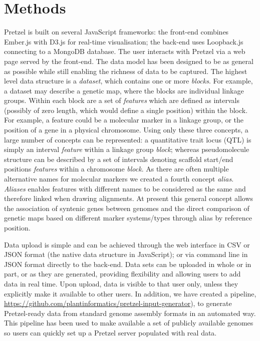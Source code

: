 %
\section{Methods}

Pretzel is built on several JavaScript frameworks: the front-end combines Ember.js with D3.js
  for real-time visualisation; the back-end uses Loopback.js connecting to a MongoDB database. 
%
The user interacts with Pretzel via a web page served by the front-end. 
%
The data model has been designed to be as general as possible while still enabling the richness of
  data to be captured. 
%
  The highest level data structure is a \textit{dataset}, which contains one or more \textit{blocks}.
%
For example, a dataset may describe a genetic map, where the blocks are individual linkage groups. 
%
  Within each block are a set of \textit{features} which are defined as intervals (possibly of zero length,
  which would define a single position) within the block. 
%
For example, a feature could be a molecular marker in a linkage group, or the position of a gene in
  a physical chromosome. 
%
Using only these three concepts, a large number of concepts can be represented: a quantitative trait locus
  (QTL) is simply an interval \textit{feature} within a linkage group \textit{block}; whereas pseudomolecule structure can be described by a
  set of intervals denoting scaffold start/end positions \textit{features} within a chromosome \textit{block}. 
%
As there are often multiple alternative names for molecular markers we created a fourth concept \textit{alias}. 
\textit{Aliases} enables features with different names to be considered as the same and therefore linked when drawing alignments. 
%
At present this general concept allows the association of syntenic genes between genomes and the direct comparison of genetic maps
  based on different marker systems/types through alias by reference position.

Data upload is simple and can be achieved through the web interface in CSV or JSON format (the native data structure in
  JavaScript); or via command line in JSON format directly to the back-end. 
%
Data sets can be uploaded in whole or in part, or as they are generated, providing flexibility and allowing users to add data in real time.
%
Upon upload, data is visible to that user only, unless they explicitly make it available to other users. 
%
In addition, we have created a pipeline, 
  \href{https://github.com/plantinformatics/pretzel-input-generator}{https://github.com/plantinformatics/pretzel-input-generator}), 
  to generate Pretzel-ready data
  from standard genome assembly formats in an automated way. This pipeline has been used to make
  available a set of publicly available genomes so users can quickly set up a Pretzel server
  populated with real data.

